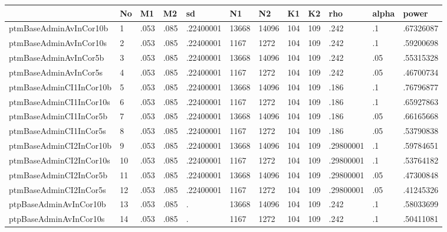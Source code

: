 \begin{table}[htbp]
\begin{tabular}{|l|l|l|l|l|l|l|l|l|l|l|l|}\hline  
 & No  & M1  & M2  & sd  & N1  & N2  & K1  & K2  & rho  & alpha  & power  \\ \hline  
ptmBaseAdminAvInCor10b & 1 & .053 & .085 & .22400001 & 13668 & 14096 & 104 & 109 & .242 & .1 & .67326087 \\ \hline 
ptmBaseAdminAvInCor10s & 2 & .053 & .085 & .22400001 & 1167 & 1272 & 104 & 109 & .242 & .1 & .59200698 \\ \hline 
ptmBaseAdminAvInCor5b & 3 & .053 & .085 & .22400001 & 13668 & 14096 & 104 & 109 & .242 & .05 & .55315328 \\ \hline 
ptmBaseAdminAvInCor5s & 4 & .053 & .085 & .22400001 & 1167 & 1272 & 104 & 109 & .242 & .05 & .46700734 \\ \hline 
ptmBaseAdminCI1InCor10b & 5 & .053 & .085 & .22400001 & 13668 & 14096 & 104 & 109 & .186 & .1 & .76796877 \\ \hline 
ptmBaseAdminCI1InCor10s & 6 & .053 & .085 & .22400001 & 1167 & 1272 & 104 & 109 & .186 & .1 & .65927863 \\ \hline 
ptmBaseAdminCI1InCor5b & 7 & .053 & .085 & .22400001 & 13668 & 14096 & 104 & 109 & .186 & .05 & .66165668 \\ \hline 
ptmBaseAdminCI1InCor5s & 8 & .053 & .085 & .22400001 & 1167 & 1272 & 104 & 109 & .186 & .05 & .53790838 \\ \hline 
ptmBaseAdminCI2InCor10b & 9 & .053 & .085 & .22400001 & 13668 & 14096 & 104 & 109 & .29800001 & .1 & .59784651 \\ \hline 
ptmBaseAdminCI2InCor10s & 10 & .053 & .085 & .22400001 & 1167 & 1272 & 104 & 109 & .29800001 & .1 & .53764182 \\ \hline 
ptmBaseAdminCI2InCor5b & 11 & .053 & .085 & .22400001 & 13668 & 14096 & 104 & 109 & .29800001 & .05 & .47300848 \\ \hline 
ptmBaseAdminCI2InCor5s & 12 & .053 & .085 & .22400001 & 1167 & 1272 & 104 & 109 & .29800001 & .05 & .41245326 \\ \hline 
ptpBaseAdminAvInCor10b & 13 & .053 & .085 & . & 13668 & 14096 & 104 & 109 & .242 & .1 & .58033699 \\ \hline 
ptpBaseAdminAvInCor10s & 14 & .053 & .085 & . & 1167 & 1272 & 104 & 109 & .242 & .1 & .50411081 \\ \hline 

\end{tabular}
\end{table}
